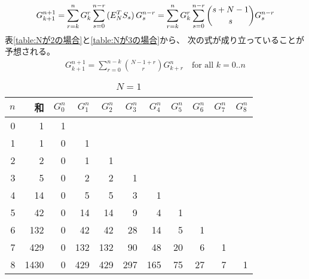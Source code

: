 {\begin{itemize}
		\begin{equation*}\begin{split}
			G^{n+1}_{k+1} 
			= \sum_{r=k}^n G^r_k \sum_{s=0}^{n-r} \mathinner{({E_N^TS_s})}G^{n-r}_s
			= \sum_{r=k}^n G^r_k \sum_{s=0}^{n-r} \binom{s+N-1}{s}G^{n-r}_s
		\end{split}\end{equation*}
		表\ref{table:Nが2の場合}と\ref{table:Nが3の場合}から、
		次の式が成り立っていることが予想される。
		\begin{equation*}\begin{split}
			G^{n+1}_{k+1} = \sum_{r=0}^{n-k} \binom{N-1+r}{r} G^n_{k+r} 
			\quad\text{for all } k=0..n
		\end{split}\end{equation*}

	\end{itemize} %

	\begin{table}[htbp] %
		\begin{center}\begin{tabular}{r|r|rrrrrrrrr} \hline
$n$ & 和 & $G^n_0$ & $G^n_1$ & $G^n_2$ & $G^n_3$ & $G^n_4$ & $G^n_5$ & $G^n_6$ & $G^n_7$ & $G^n_8$ \\\hline
0 & 1 & 1 \\
1 & 1 & 0 & 1 \\
2 & 2 & 0 & 1 & 1 \\
3 & 5 & 0 & 2 & 2 & 1 \\
4 & 14 & 0 & 5 & 5 & 3 & 1 \\
5 & 42 & 0 & 14 & 14 & 9 & 4 & 1 \\
6 & 132 & 0 & 42 & 42 & 28 & 14 & 5 & 1 \\
7 & 429 & 0 & 132 & 132 & 90 & 48 & 20 & 6 & 1 \\
8 & 1430 & 0 & 429 & 429 & 297 & 165 & 75 & 27 & 7 & 1 \\
\hline
		\end{tabular}\end{center}
		\caption{$N=1$}\label{table:Nが1の場合}
	\end{table} %

}
